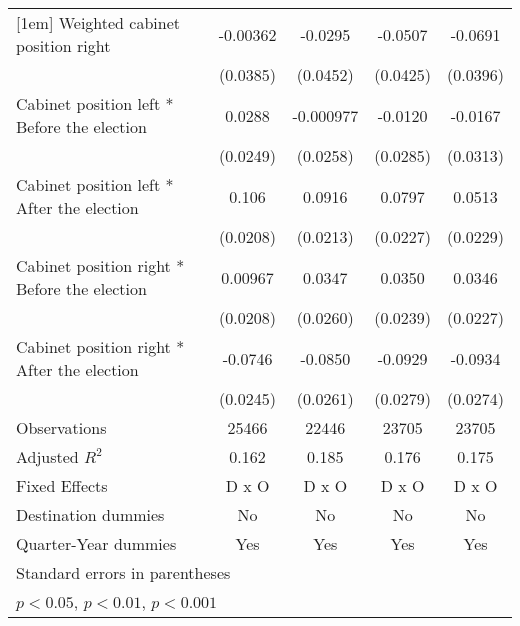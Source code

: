 \begin{table}[htbp]
\begin{tabular}{l*{4}{c}}
[1em]
Weighted cabinet position right&    -0.00362         &     -0.0295         &     -0.0507         &     -0.0691         \\
                    &    (0.0385)         &    (0.0452)         &    (0.0425)         &    (0.0396)         \\
[1em]
Cabinet position left * Before the election&      0.0288         &   -0.000977         &     -0.0120         &     -0.0167         \\
                    &    (0.0249)         &    (0.0258)         &    (0.0285)         &    (0.0313)         \\
[1em]
Cabinet position left * After the election&       0.106\sym{***}&      0.0916\sym{***}&      0.0797\sym{***}&      0.0513\sym{*}  \\
                    &    (0.0208)         &    (0.0213)         &    (0.0227)         &    (0.0229)         \\
[1em]
Cabinet position right * Before the election&     0.00967         &      0.0347         &      0.0350         &      0.0346         \\
                    &    (0.0208)         &    (0.0260)         &    (0.0239)         &    (0.0227)         \\
[1em]
Cabinet position right * After the election&     -0.0746\sym{**} &     -0.0850\sym{**} &     -0.0929\sym{**} &     -0.0934\sym{**} \\
                    &    (0.0245)         &    (0.0261)         &    (0.0279)         &    (0.0274)         \\
\hline
Observations        &       25466         &       22446         &       23705         &       23705         \\
Adjusted \(R^{2}\)  &       0.162         &       0.185         &       0.176         &       0.175         \\
Fixed Effects       &       D x O         &       D x O         &       D x O         &       D x O         \\
Destination dummies &          No         &          No         &          No         &          No         \\
Quarter-Year dummies&         Yes         &         Yes         &         Yes         &         Yes         \\
\hline\hline
\multicolumn{5}{l}{\footnotesize Standard errors in parentheses}\\
\multicolumn{5}{l}{\footnotesize \sym{*} \(p<0.05\), \sym{**} \(p<0.01\), \sym{***} \(p<0.001\)}\\
\end{tabular}
\end{table}
